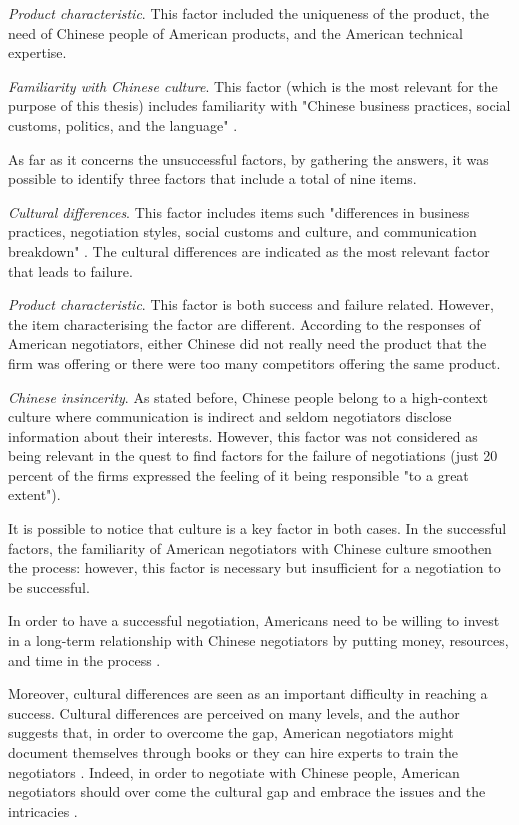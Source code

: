 \documentclass[../main.tex]{subfiles}
\begin{document}
\textit{Product characteristic}. This factor included the uniqueness of the product, the need of Chinese people of American products, and the American technical expertise.

\textit{Familiarity with Chinese culture}. This factor (which is the most relevant for the purpose of this thesis) includes familiarity with "Chinese business practices, social customs, politics, and the language" \autocite[67]{tung}.

As far as it concerns the unsuccessful factors, by gathering the answers, it was possible to identify three factors that include a total of nine items.

\textit{Cultural differences}. This factor includes items such "differences in business practices, negotiation styles, social customs and culture, and communication breakdown" \autocite[67]{tung}. The cultural differences are indicated as the most relevant factor that leads to failure.

\textit{Product characteristic}. This factor is both success and failure related. However, the item characterising the factor are different. According to the responses of American negotiators, either Chinese did not really need the product that the firm was offering or there were too many competitors offering the same product.

\textit{Chinese insincerity}. As stated before, Chinese people belong to a high-context culture where communication is indirect and seldom negotiators disclose information about their interests. However, this factor was not considered as being relevant in the quest to find factors for the failure of negotiations (just 20 percent of the firms expressed the feeling of it being responsible "to a great extent").

It is possible to notice that culture is a key factor in both cases. In the successful factors, the familiarity of American negotiators with Chinese culture smoothen the process: however, this factor is necessary but insufficient for a negotiation to be successful.

In order to have a successful negotiation, Americans need to be willing to invest in a long-term relationship with Chinese negotiators by putting money, resources, and time in the process \autocite[71]{tung}.

Moreover, cultural differences are seen as an important difficulty in reaching a success. Cultural differences are perceived on many levels, and the author suggests that, in order to overcome the gap, American negotiators might document themselves through books or they can hire experts to train the negotiators \autocite[68]{tung}. Indeed, in order to negotiate with Chinese people, American negotiators should over come the cultural gap and embrace the issues and the intricacies \mancite\autocite[72]{tung}.
\end{document}

